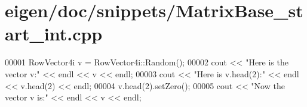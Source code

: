 \hypertarget{eigen_2doc_2snippets_2_matrix_base__start__int_8cpp_source}{}\section{eigen/doc/snippets/\+Matrix\+Base\+\_\+start\+\_\+int.cpp}
\label{eigen_2doc_2snippets_2_matrix_base__start__int_8cpp_source}

\begin{DoxyCode}
00001 RowVector4i v = RowVector4i::Random();
00002 cout << \textcolor{stringliteral}{"Here is the vector v:"} << endl << v << endl;
00003 cout << \textcolor{stringliteral}{"Here is v.head(2):"} << endl << v.head(2) << endl;
00004 v.head(2).setZero();
00005 cout << \textcolor{stringliteral}{"Now the vector v is:"} << endl << v << endl;
\end{DoxyCode}
